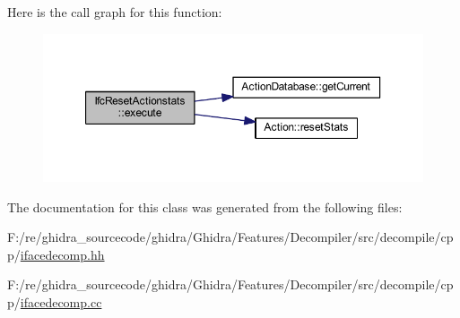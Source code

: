 Here is the call graph for this function\+:
\nopagebreak
\begin{figure}[H]
\begin{center}
\leavevmode
\includegraphics[width=350pt]{class_ifc_reset_actionstats_a814bf0bc991a7b943643f5e72b507ea5_cgraph}
\end{center}
\end{figure}


The documentation for this class was generated from the following files\+:\begin{DoxyCompactItemize}
\item 
F\+:/re/ghidra\+\_\+sourcecode/ghidra/\+Ghidra/\+Features/\+Decompiler/src/decompile/cpp/\mbox{\hyperlink{ifacedecomp_8hh}{ifacedecomp.\+hh}}\item 
F\+:/re/ghidra\+\_\+sourcecode/ghidra/\+Ghidra/\+Features/\+Decompiler/src/decompile/cpp/\mbox{\hyperlink{ifacedecomp_8cc}{ifacedecomp.\+cc}}\end{DoxyCompactItemize}
